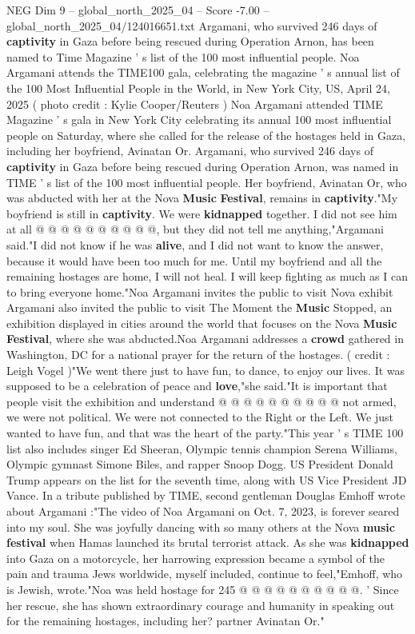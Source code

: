 \begin{textsample}{NEG Dim 9 – global\_north\_2025\_04 – Score -7.00 – global\_north\_2025\_04/124016651.txt}  \label{ex:f9_neg_126}
Argamani, who survived 246 days of \textbf{captivity} in Gaza before being rescued during Operation Arnon, has been named to Time Magazine ' s list of the 100 most influential people.
Noa Argamani attends the TIME100 gala, celebrating the magazine ' s annual list of the 100 Most Influential People in the World, in New York City, US, April 24, 2025 ( photo credit : Kylie Cooper/Reuters ) Noa Argamani attended TIME Magazine ' s gala in New York City celebrating its annual 100 most influential people on Saturday, where she called for the release of the hostages held in Gaza, including her boyfriend, Avinatan Or.
Argamani, who survived 246 days of \textbf{captivity} in Gaza before being rescued during Operation Arnon, was named in TIME ' s list of the 100 most influential people.
Her boyfriend, Avinatan Or, who was abducted with her at the Nova \textbf{Music} \textbf{Festival}, remains in \textbf{captivity}."My boyfriend is still in \textbf{captivity}.
We were \textbf{kidnapped} together.
I did not see him at all @ @ @ @ @ @ @ @ @ @, but they did not tell me anything,"Argamani said."I did not know if he was \textbf{alive}, and I did not want to know the answer, because it would have been too much for me.
Until my boyfriend and all the remaining hostages are home, I will not heal.
I will keep fighting as much as I can to bring everyone home."Noa Argamani invites the public to visit Nova exhibit Argamani also invited the public to visit The Moment the \textbf{Music} Stopped, an exhibition displayed in cities around the world that focuses on the Nova \textbf{Music} \textbf{Festival}, where she was abducted.Noa Argamani addresses a \textbf{crowd} gathered in Washington, DC for a national prayer for the return of the hostages. ( credit : Leigh Vogel )"We went there just to have fun, to dance, to enjoy our lives.
It was supposed to be a celebration of peace and \textbf{love},"she said."It is important that people visit the exhibition and understand @ @ @ @ @ @ @ @ @ @ not armed, we were not political.
We were not connected to the Right or the Left.
We just wanted to have fun, and that was the heart of the party."This year ' s TIME 100 list also includes singer Ed Sheeran, Olympic tennis champion Serena Williams, Olympic gymnast Simone Biles, and rapper Snoop Dogg.
US President Donald Trump appears on the list for the seventh time, along with US Vice President JD Vance.
In a tribute published by TIME, second gentleman Douglas Emhoff wrote about Argamani :"The video of Noa Argamani on Oct. 7, 2023, is forever seared into my soul.
She was joyfully dancing with so many others at the Nova \textbf{music} \textbf{festival} when Hamas launched its brutal terrorist attack.
As she was \textbf{kidnapped} into Gaza on a motorcycle, her harrowing expression became a symbol of the pain and trauma Jews worldwide, myself included, continue to feel,"Emhoff, who is Jewish, wrote."Noa was held hostage for 245 @ @ @ @ @ @ @ @ @ @. ' Since her rescue, she has shown extraordinary courage and humanity in speaking out for the remaining hostages, including her? partner Avinatan Or."

\end{textsample}
